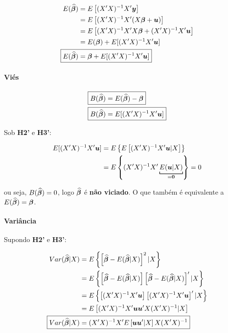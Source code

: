 \documentclass[11pt,oneside,a4paper]{article}
\numberwithin{equation}{section}
\begin{document}
\begin{align*} 
E ( \widehat{\mbs{\beta}} ) 
&= E \left[ (X'X)^{-1}X'\mbs{y} \right]
\\
&= E \left[ (X'X)^{-1}X'(X \mbs{\beta} + \mbs{u}) \right]
\\
&= E \left[ (X'X)^{-1}X'X \mbs{\beta} + (X'X)^{-1}X'\mbs{u} \right]
\\
&= E (\mbs{\beta}) + E[(X'X)^{-1}X'\mbs{u} ]
\\
\Aboxed{
E ( \widehat{\mbs{\beta}} ) 
&= \mbs{\beta} + E[(X'X)^{-1}X'\mbs{u} ] }
\end{align*}

\paragraph{Viés} 

\begin{align*} 
\Aboxed{ B( \widehat{\mbs{\beta}} ) &= E ( \widehat{\mbs{\beta}} ) - \mbs{\beta} }
\\
\Aboxed{ B( \widehat{\mbs{\beta}} ) &= E[ (X'X)^{-1}X'\mbs{u} ] }
\end{align*}

Sob \textbf{H2'} e \textbf{H3'}:

\begin{align*}
E[(X'X)^{-1}X'\mbs{u} ]
&= E \left\{ E\left[ (X'X)^{-1}X'\mbs{u} | X \right]  \right\}  
\\
&= E \left\{  (X'X)^{-1}X'
\underbracket[.75pt]{E( \mbs{u} | X )}_{= \mbs{0}}
\right\} = 0
\end{align*}

\noindent
ou seja, 
$B( \widehat{\boldsymbol{\beta}} ) = 0$, logo $\widehat{\boldsymbol{\beta}}$ é \textbf{não viciado}.
O que também é equivalente a  $E( \widehat{\boldsymbol{\beta}} ) = \boldsymbol{\beta}$.

\paragraph{Variância} 
Supondo \textbf{H2'} e \textbf{H3'}:

\begin{align*} 
Var ( \widehat{\mbs{\beta}} | X) 
&= E \left\{\left[ 
\widehat{\mbs{\beta}} - E ( \widehat{\mbs{\beta}} | X )
\right]^2 | X \right\}
\\
&= E \left\{ 
\left[ \widehat{\mbs{\beta}} - E ( \widehat{\mbs{\beta}} | X ) \right]
\left[ \widehat{\mbs{\beta}} - E ( \widehat{\mbs{\beta}} | X ) \right]'
| X \right\}
\\
&= E \left\{ 
\left[ (X'X)^{-1}X' \mbs{u} \right]
\left[ (X'X)^{-1}X' \mbs{u} \right]'
| X \right\}
\\
&= E \left[ (X'X)^{-1}X' \mbs{u} \mbs{u}' X (X'X)^{-1} | X \right]
\\
\Aboxed{
Var ( \widehat{\mbs{\beta}} | X) 
&= 
(X'X)^{-1}X' 
E \left[ \mbs{u} \mbs{u}'| X \right]
X (X'X)^{-1} }
\end{align*}
\end{document}
